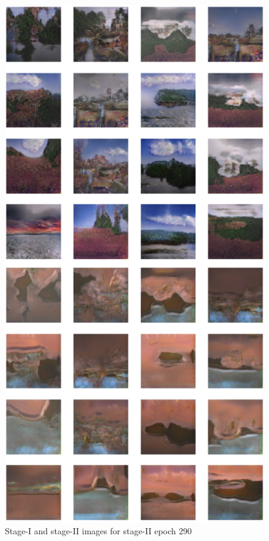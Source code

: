 \documentclass{article}
\begin{document}
	\begin{figure}[h]
	\centering
	\includegraphics[scale=0.6]{images/epoch290_FID406.png}
	\caption{Stage-I and stage-II images for stage-II epoch 290}
	\end{figure}
\end{document}
